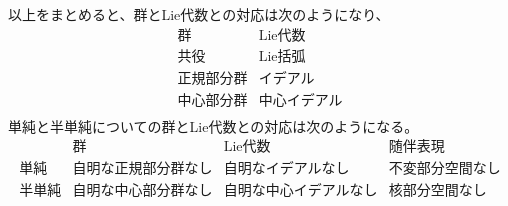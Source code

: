 {	以上をまとめると、群とLie代数との対応は次のようになり、
	\begin{equation*}\begin{array}{cc}
		\text{群} & \text{Lie代数} \\ \hline
		\text{共役} & \text{Lie括弧} \\
		\text{正規部分群} & \text{イデアル} \\
		\text{中心部分群} & \text{中心イデアル} \\
	\end{array}\end{equation*}
	単純と半単純についての群とLie代数との対応は次のようになる。
	\begin{equation*}\begin{array}{c|ccc}
		& \text{群} & \text{Lie代数} & \text{随伴表現} \\ \hline
		\text{単純} & \text{自明な正規部分群なし} 
			& \text{自明なイデアルなし} & \text{不変部分空間なし} \\
		\text{半単純} & \text{自明な中心部分群なし} 
			& \text{自明な中心イデアルなし} & \text{核部分空間なし} \\
	\end{array}\end{equation*}
}
